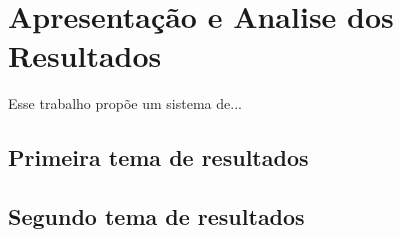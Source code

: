 \chapter{Apresentação e Analise dos Resultados}\label{cap:apresAnaRes}

Esse trabalho propõe um sistema de... 


\section{Primeira tema de resultados}

\lipsum[20]

\section{Segundo tema de resultados}

